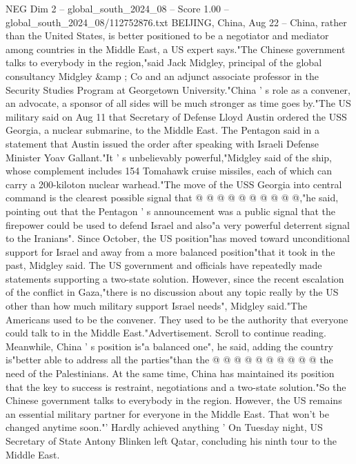 \begin{textsample}{NEG Dim 2 – global\_south\_2024\_08 – Score 1.00 – global\_south\_2024\_08/112752876.txt}  \label{ex:f2_neg_115}
BEIJING, China, Aug 22 -- China, rather than the United States, is better positioned to be a negotiator and mediator among countries in the Middle East, a US expert says."The Chinese government talks to everybody in the region,"said Jack Midgley, principal of the global consultancy Midgley \&amp ; Co and an adjunct associate professor in the Security Studies Program at Georgetown University."China ' s role as a convener, an advocate, a sponsor of all sides will be much stronger as time goes by."The US military said on Aug 11 that Secretary of Defense Lloyd Austin ordered the USS Georgia, a nuclear submarine, to the Middle East.
The Pentagon said in a statement that Austin issued the order after speaking with Israeli Defense Minister Yoav Gallant."It ' s unbelievably powerful,"Midgley said of the ship, whose complement includes 154 Tomahawk cruise missiles, each of which can carry a 200-kiloton nuclear warhead."The move of the USS Georgia into central command is the clearest possible signal that @ @ @ @ @ @ @ @ @ @,"he said, pointing out that the Pentagon ' s announcement was a public signal that the firepower could be used to defend Israel and also"a very powerful deterrent signal to the Iranians".
Since October, the US position"has moved toward unconditional support for Israel and away from a more balanced position"that it took in the past, Midgley said.
The US government and officials have repeatedly made statements supporting a two-state solution.
However, since the recent escalation of the conflict in Gaza,"there is no discussion about any topic really by the US other than how much military support Israel needs", Midgley said."The Americans used to be the convener.
They used to be the authority that everyone could talk to in the Middle East."Advertisement.
Scroll to continue reading.
Meanwhile, China ' s position is"a balanced one", he said, adding the country is"better able to address all the parties"than the @ @ @ @ @ @ @ @ @ @ the need of the Palestinians.
At the same time, China has maintained its position that the key to success is restraint, negotiations and a two-state solution."So the Chinese government talks to everybody in the region.
However, the US remains an essential military partner for everyone in the Middle East.
That won't be changed anytime soon."' Hardly achieved anything ' On Tuesday night, US Secretary of State Antony Blinken left Qatar, concluding his ninth tour to the Middle East.

\end{textsample}
